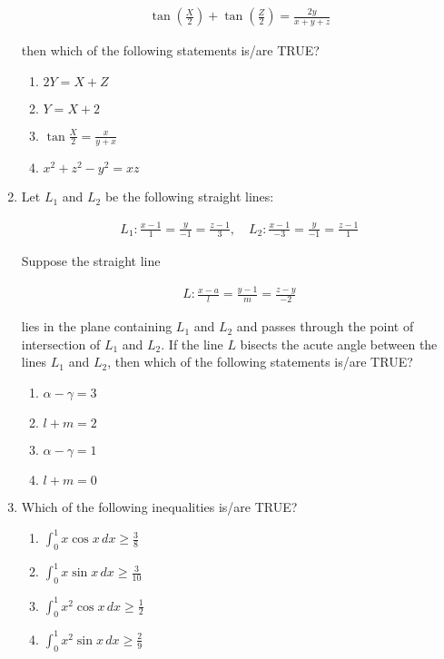 \documentclass{article}
\begin{document}
\begin{enumerate}
\begin{align}
    \tan(\frac{X}{2}) + \tan(\frac{Z}{2}) = \frac{2y}{x + y + z}
\end{align}

    then which of the following statements is/are TRUE?

    \begin{enumerate}
        \item  $2Y = X + Z$
        \item  $Y = X + 2$
	\item  $\tan\frac{X}{2} = \frac{x}{y + x}$        \item  $x^2 + z^2 - y^2 = xz$
    \end{enumerate}

\item   Let $L_1$ and $L_2$ be the following straight lines:

\begin{align}
	L_1 :\frac{x - 1}{1} = \frac{y}{-1} = \frac{z - 1}{3}, \quad 
	L_2 : \frac{x - 1}{-3} = \frac{y}{-1} = \frac{z - 1}{1}
\end{align}

    Suppose the straight line 

\begin{align}
    L :  \frac{x - a}{l} = \frac{y - 1}{m} = \frac{z - y}{-2}
\end{align}

    lies in the plane containing $L_1$ and $L_2$ and passes through the point of intersection of $L_1$ and $L_2$. If the line $L$ bisects the acute angle between the lines $L_1$ and $L_2$, then which of the following statements is/are TRUE?

    \begin{enumerate}
        \item  $\alpha - \gamma = 3$
        \item  $l + m = 2$
        \item  $\alpha - \gamma = 1$
        \item  $l + m = 0$
    \end{enumerate}

\item   Which of the following inequalities is/are TRUE?

    \begin{enumerate}
        \item  $\int_0^1 x \cos x \,dx \geq \frac{3}{8}$
        \item  $\int_0^1 x \sin x \,dx \geq \frac{3}{10}$
        \item  $\int_0^1 x^2 \cos x \,dx \geq \frac{1}{2}$
        \item  $\int_0^1 x^2 \sin x \,dx \geq \frac{2}{9}$
    \end{enumerate}


\end{enumerate}
\end{document}
